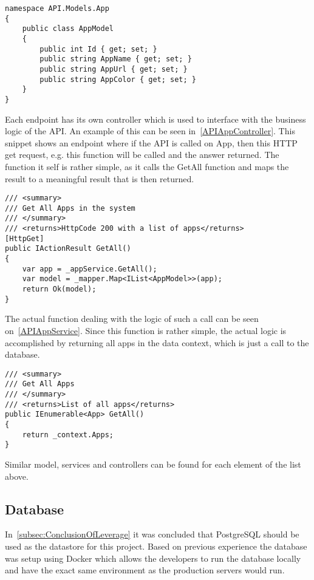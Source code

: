 \begin{lstlisting}[caption={API App model}, label={APIAppModel}, language={CSharp}]
namespace API.Models.App
{
    public class AppModel
    {
        public int Id { get; set; }
        public string AppName { get; set; }
        public string AppUrl { get; set; }
        public string AppColor { get; set; }
    }
}
\end{lstlisting}

Each endpoint has its own controller which is used to interface with the business logic of the API.
An example of this can be seen in~\autoref{APIAppController}.
This snippet shows an endpoint where if the API is called on App, then this HTTP get request, e.g. this function will be called and the answer returned.
The function it self is rather simple, as it calls the GetAll function and maps the result to a meaningful result that is then returned.

\begin{lstlisting}[caption={API App Controller GetAll Function}, label={APIAppController}, language={CSharp}]
/// <summary>
/// Get All Apps in the system
/// </summary>
/// <returns>HttpCode 200 with a list of apps</returns>
[HttpGet]
public IActionResult GetAll()
{
    var app = _appService.GetAll();
    var model = _mapper.Map<IList<AppModel>>(app);
    return Ok(model);
}
\end{lstlisting}

The actual function dealing with the logic of such a call can be seen on~\autoref{APIAppService}.
Since this function is rather simple, the actual logic is accomplished by returning all apps in the data context, which is just a call to the database.

\begin{lstlisting}[caption={API App Controller GetAll Function}, label={APIAppService}, language={CSharp}]
/// <summary>
/// Get All Apps
/// </summary>
/// <returns>List of all apps</returns>
public IEnumerable<App> GetAll()
{
    return _context.Apps;
}
\end{lstlisting}

Similar model, services and controllers can be found for each element of the list above.

\subsection{Database}

In~\autoref{subsec:ConclusionOfLeverage} it was concluded that PostgreSQL should be used as the datastore for this project.
Based on previous experience the database was setup using Docker which allows the developers to run the database locally and have the exact same environment as the production servers would run.

